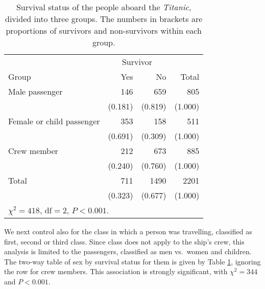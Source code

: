\begin{table}
\caption{Survival status of the people aboard the \emph{Titanic},
divided into three groups. The numbers in brackets are
proportions of survivors and non-survivors within each group.}
\label{t_titanic2}
\begin{center}
\begin{tabular}{|l|rr|r|}\hline
& \multicolumn{2}{|c|}{Survivor} & \\
Group & Yes & No & Total \\ \hline
Male passenger & 146 & 659 & 805 \\
 & (0.181) & (0.819) & (1.000) \\
Female or child passenger & 353 & 158 & 511 \\
 & (0.691) & (0.309) & (1.000) \\
Crew member & 212 & 673 & 885 \\
 & (0.240) & (0.760) & (1.000) \\ \hline
Total & 711 & 1490 & 2201 \\
 & (0.323) & (0.677) & (1.000) \\
\hline
\multicolumn{4}{l}{\small $\chi^{2}=418$, $\text{df}=2$, $P<0.001$.}
\end{tabular}
\end{center}
\end{table}

We next control also for the
class in which a person was travelling, classified as first, second or
third class. Since class does not apply to the ship's crew, this
analysis is limited to the passengers, classified as men vs.\ women and
children. The two-way table of sex by survival status for them is
given by Table \ref{t_titanic2}, ignoring the row for crew members. This
association is strongly significant, with
$\chi^{2}=344$ and $P<0.001$.


